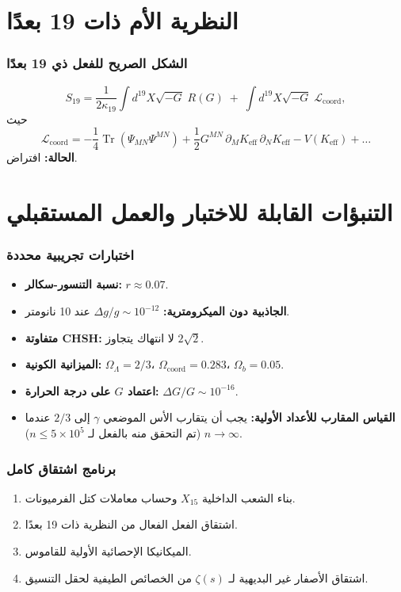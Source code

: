 \documentclass[11pt,a4paper]{article}
\DeclareMathOperator{\Tr}{Tr}
\newcommand{\coord}{\mathrm{coord}}
\begin{document}
	\part{النظرية الأم ذات 19 بعدًا}
	
	\section{الشكل الصريح للفعل ذي 19 بعدًا}
	\label{sec:19Dlagrangian}
	\[
	S_{19} = \frac{1}{2\kappa_{19}} \int d^{19}X \sqrt{-G}\; R(G) \;+\; \int d^{19}X \sqrt{-G}\; \mathcal{L}_{\text{coord}},
	\]
	حيث
	\[
	\mathcal{L}_{\text{coord}} = -\frac{1}{4} \Tr(\Psi_{MN}\Psi^{MN}) + \frac{1}{2} G^{MN}\,\partial_M K_{\mathrm{eff}}\,\partial_N K_{\mathrm{eff}} - V(K_{\mathrm{eff}}) + \dots
	\]
	\textbf{الحالة:} افتراض.
	
	\part{التنبؤات القابلة للاختبار والعمل المستقبلي}
	
	\section{اختبارات تجريبية محددة}
	\begin{itemize}
		\item \textbf{نسبة التنسور-سكالر:} \(r \approx 0.07\).
		\item \textbf{الجاذبية دون الميكرومترية:} \(\Delta g/g \sim 10^{-12}\) عند 10 نانومتر.
		\item \textbf{متفاوتة CHSH:} لا انتهاك يتجاوز \(2\sqrt{2}\).
		\item \textbf{الميزانية الكونية:} \(\Omega_\Lambda = 2/3\)، \(\Omega_{\coord} = 0.283\)، \(\Omega_b = 0.05\).
		\item \textbf{اعتماد \(G\) على درجة الحرارة:} \(\Delta G/G \sim 10^{-16}\).
		\item \textbf{القياس المقارب للأعداد الأولية:} يجب أن يتقارب الأس الموضعي \(\gamma\) إلى \(2/3\) عندما \(n\to\infty\) (تم التحقق منه بالفعل لـ \(n\le 5\times10^5\)).
	\end{itemize}
	
	\section{برنامج اشتقاق كامل}
	\begin{enumerate}
		\item بناء الشعب الداخلية \(X_{15}\) وحساب معاملات كتل الفرميونات.
		\item اشتقاق الفعل الفعال من النظرية ذات 19 بعدًا.
		\item الميكانيكا الإحصائية الأولية للقاموس.
		\item اشتقاق الأصفار غير البديهية لـ \(\zeta(s)\) من الخصائص الطيفية لحقل التنسيق.
	\end{enumerate}
	
\end{document}
